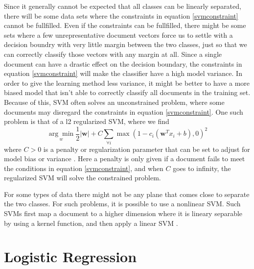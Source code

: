 Since it generally cannot be expected that all classes can be linearly separated, there will be some data sets where the constraints in equation \ref{svmconstraint} cannot be fullfilled. Even if the constraints can be fullfilled, there might be some sets where a few unrepresentative document vectors force us to settle with a decision boundry with very little margin between the two classes, just so that we can correctly classify those vectors with any margin at all. Since a single document can have a drastic effect on the decision boundary, the constraints in equation \ref{svmconstraint} will make the classifier have a high model variance. In order to give the learning method less variance, it might be better to have a more biased model that isn't able to correctly classify all documents in the training set. Because of this, SVM often solves an unconstrained problem, where some documents may disregard the constraints in equation \ref{svmconstraint}. One such problem is that of a l2 regularized SVM, where we find
\begin{equation}
\label{svmregularized}
\underset{w}{\arg \min} \frac{1}{2}|\mathbf{w}|+C\sum_{\forall i} \max(1-c_i(\mathbf{w}^Tx_i+b), 0)^2
\end{equation}
where $C > 0$ is a penalty or regularization parameter that can be set to adjust for model bias or variance \cite{liblinear}. Here a penalty is only given if a document fails to meet the conditions in equation \ref{svmconstraint}, and when $C$ goes to infinity, the regularized SVM will solve the constrained problem.

For some types of data there might not be any plane that comes close to separate the two classes. For such problems, it is possible to use a nonlinear SVM. Such SVMs first map a document to a higher dimension where it is lineary separable by using a kernel function, and then apply a linear SVM \cite[p. 331]{information}. 

\section{Logistic Regression}

